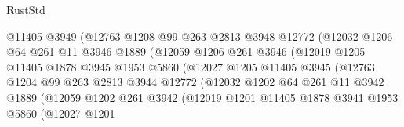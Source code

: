\begin{lexlean}{RustStd}
\begin{coremodule}
{\begin{coremodule}
{{{{{{{{{{{{{{{{{{{{{{{{{{{{{                              @11405
                              @3949
                              (@12763
                                @1208
                                @99
                                @263
                                @2813
                                @3948
                                @12772
                                (@12032
                                  @1206
                                  @64
                                  @261
                                  @11
                                  @3946
                                  @1889
                                  (@12059
                                    @1206
                                    @261
                                    @3946
                                    (@12019
                                      @1205
                                      @11405
                                      @1878
                                      @3945
                                      @1953
                                      @5860
                                      (@12027
                                        @1205
                                        @11405
                                        @3945
                                        (@12763
                                          @1204
                                          @99
                                          @263
                                          @2813
                                          @3944
                                          @12772
                                          (@12032
                                            @1202
                                            @64
                                            @261
                                            @11
                                            @3942
                                            @1889
                                            (@12059
                                              @1202
                                              @261
                                              @3942
                                              (@12019
                                                @1201
                                                @11405
                                                @1878
                                                @3941
                                                @1953
                                                @5860
                                                (@12027
                                                  @1201
}}}}}}}}}}}}}}}}}}}}}}}}}}}}}
\end{coremodule}}
\end{coremodule}
\end{lexlean}
